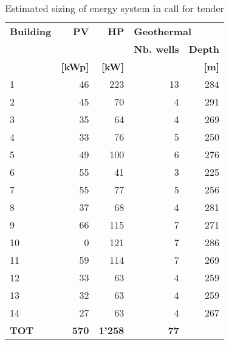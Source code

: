 \begin{table}[h!]
\centering
\caption{Estimated sizing of energy system in call for tender}\vspace{2mm}
\label{tab:ppa_prestudy} 
\begin{tabular}{lrrrr}
\toprule
\textbf{Building} & \textbf{PV}    & \textbf{HP}    & \multicolumn{2}{l}{\textbf{Geothermal}} \\
         &       &       & \textbf{Nb. wells}        & \textbf{Depth}        \\
         & \textbf{[kWp]} & \textbf{[kW] } &                 & \textbf{[m] }         \\
         \midrule
1        & 46    & 223   & 13              & 284          \\
2        & 45    & 70    & 4               & 291          \\
3        & 35    & 64    & 4               & 269          \\
4        & 33    & 76    & 5               & 250          \\
5        & 49    & 100   & 6               & 276          \\
6        & 55    & 41    & 3               & 225          \\
7        & 55    & 77    & 5               & 256          \\
8        & 37    & 68    & 4               & 281          \\
9        & 66    & 115   & 7               & 271          \\
10       & 0     & 121   & 7               & 286          \\
11       & 59    & 114   & 7               & 269          \\
12       & 33    & 63    & 4               & 259          \\
13       & 32    & 63    & 4               & 259          \\
14       & 27    & 63    & 4               & 267          \\
\midrule
\textbf{TOT}      & \textbf{570}   & \textbf{1'258} & \textbf{77}              &             \\
\bottomrule
\end{tabular}
\end{table}